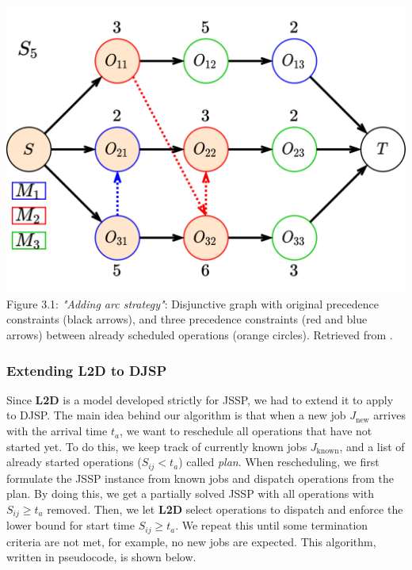 \begin{center}
    \includegraphics[width=0.75\linewidth]{images/jssp_adding_arcs.pdf}\\
    Figure 3.1: \textit{"Adding arc strategy"}: Disjunctive graph with original precedence constraints (black arrows), and three precedence constraints (red and blue arrows) between already scheduled operations (orange circles). Retrieved from \cite{zhang2020learning}.
\end{center}

\subsubsection{Extending L2D to DJSP}

Since \textbf{L2D} is a model developed strictly for JSSP, we had to extend it to apply to DJSP. The main idea behind our algorithm is that when a new job $J_\text{new}$ arrives with the arrival time $t_a$, we want to reschedule all operations that have not started yet. To do this, we keep track of currently known jobs $J_\text{known}$, and a list of already started operations ($S_{ij} < t_a$) called \textit{plan}. When rescheduling, we first formulate the JSSP instance from known jobs and dispatch operations from the plan. By doing this, we get a partially solved JSSP with all operations with $S_{ij} \geq t_a$ removed. Then, we let \textbf{L2D} select operations to dispatch and enforce the lower bound for start time $S_{ij} \geq  t_a$. We repeat this until some termination criteria are not met, for example, no new jobs are expected. This algorithm, written in pseudocode, is shown below.


